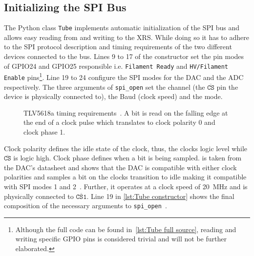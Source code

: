         \subsection{Initializing the SPI Bus}
            The Python class \texttt{Tube} implements automatic initialization of the SPI bus and allows easy reading from and writing to the XRS.
            While doing so it has to adhere to the SPI protocol description and timing requirements of the two different devices connected to the bus.
            Lines 9 to 17 of the constructor set the pin modes of GPIO24 and GPIO25 responsible i.e. \texttt{Filament Ready} and \texttt{HV/Filament Enable} pins\footnote{Although the full code can be found in~\cref{lst:Tube full source}, reading and writing specific GPIO pins is considered trivial and will not be further elaborated.}.
            Line 19 to 24 configure the SPI modes for the DAC and the ADC respectively.
            The three arguments of \texttt{spi\_open} set the channel (the \(\overline{\texttt{CS}}\) pin the device is physically connected to), the Baud (clock speed) and the mode.

            \begin{figure}[h]
                \centering
                
                \caption[TLV5618a timing requirements]{TLV5618a timing requirements~\cite{Manual.DAC.TLV5618A}. A bit is read on the falling edge at the end of a clock pulse which translates to clock polarity 0 and clock phase 1.}
                \label{fig:tlv5618a timing req}
            \end{figure}\par\medskip

            Clock polarity defines the idle state of the clock, thus, the clocks logic level while \(\overline{\texttt{CS}}\) is logic high.
            Clock phase defines when a bit is being sampled.
             is taken from the DAC's datasheet and shows that the DAC is compatible with either clock polarities and samples a bit on the clocks transition to idle making it compatible with SPI modes 1 and 2~\cite{Manual.IntroductionToSPIInterface.Dhaker.SPI}.
            Further, it operates at a clock speed of \qty{20}{\mega\hertz} and is physically connected to \(\overline{\texttt{CS1}}\).
            Line 19 in \cref{lst:Tube constructor} shows the final composition of the necessary arguments to \texttt{spi\_open}~\cite{Manual.PigpioLibrary}.\par\medskip

